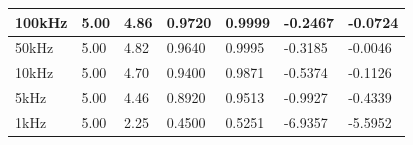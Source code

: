 \documentclass{article}
\begin{document}
\begin{table}[H]
\begin{tabular}{|l|l|l|l|l|l|l|}
		100kHz    & 5.00                                                                      & 4.86                                                                           & 0.9720                                                                  & 0.9999                                                                             & -0.2467                                                                         & -0.0724                                                                                     \\ \hline
		50kHz     & 5.00                                                                      & 4.82                                                                           & 0.9640                                                                  & 0.9995                                                                             & -0.3185                                                                         & -0.0046                                                                                     \\ \hline
		10kHz     & 5.00                                                                      & 4.70                                                                           & 0.9400                                                                  & 0.9871                                                                             & -0.5374                                                                         & -0.1126                                                                                     \\ \hline
		5kHz      & 5.00                                                                      & 4.46                                                                           & 0.8920                                                                  & 0.9513                                                                             & -0.9927                                                                         & -0.4339                                                                                     \\ \hline
		1kHz      & 5.00                                                                      & 2.25                                                                           & 0.4500                                                                  & 0.5251                                                                             & -6.9357                                                                         & -5.5952                                                                                     \\ \hline

\end{tabular}
\end{table}
\end{document}
